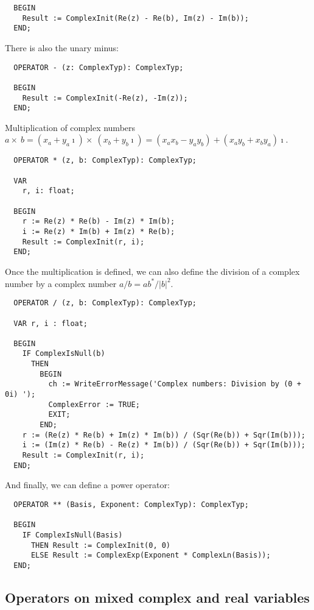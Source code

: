 \begin{refsection}
\begin{lstlisting}
  BEGIN
    Result := ComplexInit(Re(z) - Re(b), Im(z) - Im(b));
  END;
\end{lstlisting}

There is also the unary minus:
\begin{lstlisting}
  OPERATOR - (z: ComplexTyp): ComplexTyp;

  BEGIN
    Result := ComplexInit(-Re(z), -Im(z));
  END;
\end{lstlisting}


Multiplication of complex numbers \(a \times\ b = (x_a + y_a\imath) \times\ (x_b + y_b \imath) = (x_a x_b - y_a y_b) + (x_a y_b + x_b y_a)\imath \).
\begin{lstlisting}
  OPERATOR * (z, b: ComplexTyp): ComplexTyp;

  VAR
    r, i: float;

  BEGIN
    r := Re(z) * Re(b) - Im(z) * Im(b);
    i := Re(z) * Im(b) + Im(z) * Re(b);
    Result := ComplexInit(r, i);
  END;
\end{lstlisting}

Once the multiplication is defined, we can also define the division of a complex number by a complex number \(a/b = a b^* / |b|^2 \).

\begin{lstlisting}
  OPERATOR / (z, b: ComplexTyp): ComplexTyp;

  VAR r, i : float;

  BEGIN
    IF ComplexIsNull(b)
      THEN
        BEGIN
          ch := WriteErrorMessage('Complex numbers: Division by (0 + 0i) ');
          ComplexError := TRUE;
          EXIT;
        END;
    r := (Re(z) * Re(b) + Im(z) * Im(b)) / (Sqr(Re(b)) + Sqr(Im(b)));
    i := (Im(z) * Re(b) - Re(z) * Im(b)) / (Sqr(Re(b)) + Sqr(Im(b)));
    Result := ComplexInit(r, i);
  END;
\end{lstlisting}

And finally, we can define a power operator:
\begin{lstlisting}
  OPERATOR ** (Basis, Exponent: ComplexTyp): ComplexTyp;

  BEGIN
    IF ComplexIsNull(Basis)
      THEN Result := ComplexInit(0, 0)
      ELSE Result := ComplexExp(Exponent * ComplexLn(Basis));
  END;
\end{lstlisting}

\subsection{Operators on mixed complex and real variables}


\end{refsection}
